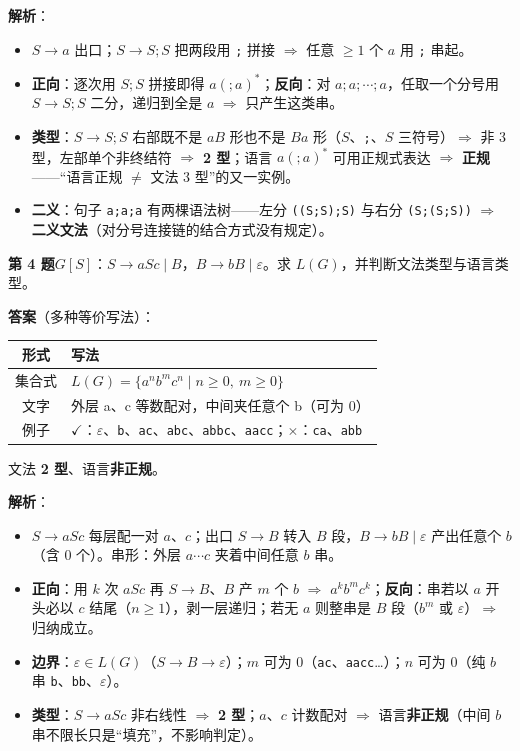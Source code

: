 \documentclass[12pt,a4paper,fontset=windows]{ctexart}
\newcommand{\ok}{\ensuremath{\checkmark}}
\newcommand{\bad}{\ensuremath{\times}}
\newcommand{\imp}{\ensuremath{\Rightarrow}}
\begin{document}
\textbf{解析}：
\begin{itemize}
\item $S \to a$ 出口；$S \to S;S$ 把两段用 \texttt{;} 拼接 \imp{} 任意 $\ge 1$ 个 $a$ 用 \texttt{;} 串起。
\item \textbf{正向}：逐次用 $S;S$ 拼接即得 $a( ; a)^*$；\textbf{反向}：对 $a;a;\cdots;a$，任取一个分号用 $S \to S;S$ 二分，递归到全是 $a$ \imp{} 只产生这类串。
\item \textbf{类型}：$S \to S;S$ 右部既不是 $aB$ 形也不是 $Ba$ 形（$S$、\texttt{;}、$S$ 三符号）\imp{} 非 3 型，左部单个非终结符 \imp{} \textbf{2 型}；语言 $a( ; a)^*$ 可用正规式表达 \imp{} \textbf{正规}——``语言正规 $\ne$ 文法 3 型''的又一实例。
\item \textbf{二义}：句子 \texttt{a;a;a} 有两棵语法树——左分 \texttt{((S;S);S)} 与右分 \texttt{(S;(S;S))} \imp{} \textbf{二义文法}（对分号连接链的结合方式没有规定）。
\end{itemize}

\begin{qbox}
{\large\bfseries 第 4 题}\quad $G[S]$：$S \to aSc \mid B$，$B \to bB \mid \varepsilon$。求 $L(G)$，并判断文法类型与语言类型。
\end{qbox}

\textbf{答案}（多种等价写法）：

\begin{center}
\renewcommand{\arraystretch}{1.25}
\begin{tabular}{c p{11.2cm}}
\toprule
\textbf{形式} & \textbf{写法} \\
\midrule
集合式 & $L(G)=\{a^n b^m c^n \mid n \ge 0,\ m \ge 0\}$ \\
文字 & 外层 a、c 等数配对，中间夹任意个 b（可为 0） \\
例子 & \ok：$\varepsilon$、\texttt{b}、\texttt{ac}、\texttt{abc}、\texttt{abbc}、\texttt{aacc}；\bad：\texttt{ca}、\texttt{abb} \\
\bottomrule
\end{tabular}
\end{center}

文法 \textbf{2 型}、语言\textbf{非正规}。

\textbf{解析}：
\begin{itemize}
\item $S \to aSc$ 每层配一对 $a$、$c$；出口 $S \to B$ 转入 $B$ 段，$B \to bB \mid \varepsilon$ 产出任意个 $b$（含 0 个）。串形：外层 $a \cdots c$ 夹着中间任意 $b$ 串。
\item \textbf{正向}：用 $k$ 次 $aSc$ 再 $S \to B$、$B$ 产 $m$ 个 $b$ \imp{} $a^k b^m c^k$；\textbf{反向}：串若以 $a$ 开头必以 $c$ 结尾（$n \ge 1$），剥一层递归；若无 $a$ 则整串是 $B$ 段（$b^m$ 或 $\varepsilon$）\imp{} 归纳成立。
\item \textbf{边界}：\textbf{$\varepsilon \in L(G)$}（$S \to B \to \varepsilon$）；$m$ 可为 $0$（\texttt{ac}、\texttt{aacc}…）；$n$ 可为 $0$（纯 $b$ 串 \texttt{b}、\texttt{bb}、$\varepsilon$）。
\item \textbf{类型}：$S \to aSc$ 非右线性 \imp{} \textbf{2 型}；$a$、$c$ 计数配对 \imp{} 语言\textbf{非正规}（中间 $b$ 串不限长只是``填充''，不影响判定）。
\end{itemize}
\end{document}
